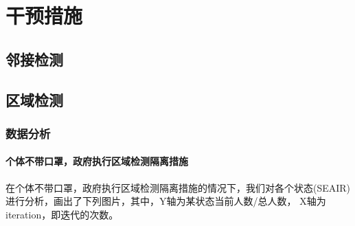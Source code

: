 
\part{干预措施}
    \chapter{邻接检测}
    \chapter{区域检测}
        \section{数据分析}
            \subsection{个体不带口罩，政府执行区域检测隔离措施}
                在个体不带口罩，政府执行区域检测隔离措施的情况下，我们对各个状态(SEAIR)进行分析，画出了下列图片，其中，Y轴为某状态当前人数/总人数，
                X轴为iteration，即迭代的次数。
